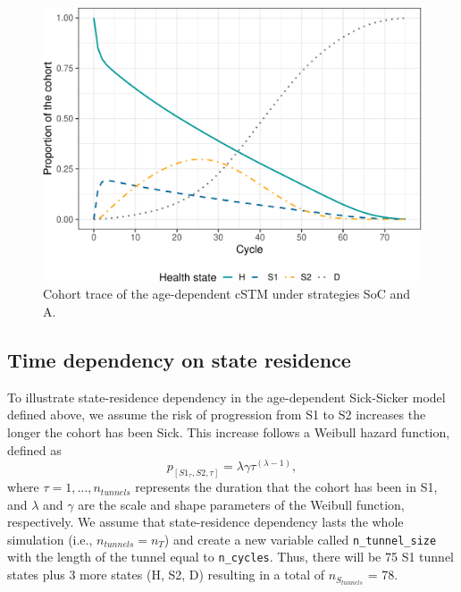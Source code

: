\documentclass[
]{article}
\begin{document}
\begin{figure}[H]

{\centering \includegraphics{../figs/Sick-Sicker-Trace-AgeDep-1} 

}

\caption{Cohort trace of the age-dependent cSTM under strategies SoC and A.}\label{fig:Sick-Sicker-Trace-AgeDep}
\end{figure}

\hypertarget{time-dependency-on-state-residence-1}{%
\subsection{Time dependency on state residence}\label{time-dependency-on-state-residence-1}}

To illustrate state-residence dependency in the age-dependent Sick-Sicker model defined above, we assume the risk of progression from S1 to S2 increases the longer the cohort has been Sick. This increase follows a Weibull hazard function, defined as
\[
  p_{\left[S1_{\tau},S2, \tau\right]} = \lambda \gamma \tau^{(\lambda-1)},
\]
where \(\tau = 1, \ldots, n_{tunnels}\) represents the duration that the cohort has been in S1, and \(\lambda\) and \(\gamma\) are the scale and shape parameters of the Weibull function, respectively. We assume that state-residence dependency lasts the whole simulation (i.e., \(n_{tunnels}=n_T\)) and create a new variable called \texttt{n\_tunnel\_size} with the length of the tunnel equal to \texttt{n\_cycles}. Thus, there will be 75 S1 tunnel states plus 3 more states (H, S2, D) resulting in a total of \(n_{S_{tunnels}}\) = 78.
\end{document}
